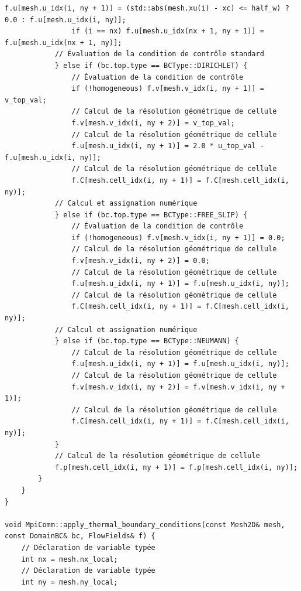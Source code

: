 \documentclass[10pt,a4paper,oneside]{book}
\begin{document}
\begin{lstlisting}[language={[11]C++}]
                f.u[mesh.u_idx(i, ny + 1)] = (std::abs(mesh.xu(i) - xc) <= half_w) ? 0.0 : f.u[mesh.u_idx(i, ny)];
                if (i == nx) f.u[mesh.u_idx(nx + 1, ny + 1)] = f.u[mesh.u_idx(nx + 1, ny)];
            // Évaluation de la condition de contrôle standard
            } else if (bc.top.type == BCType::DIRICHLET) {
                // Évaluation de la condition de contrôle
                if (!homogeneous) f.v[mesh.v_idx(i, ny + 1)] = v_top_val;
                // Calcul de la résolution géométrique de cellule
                f.v[mesh.v_idx(i, ny + 2)] = v_top_val;
                // Calcul de la résolution géométrique de cellule
                f.u[mesh.u_idx(i, ny + 1)] = 2.0 * u_top_val - f.u[mesh.u_idx(i, ny)];
                // Calcul de la résolution géométrique de cellule
                f.C[mesh.cell_idx(i, ny + 1)] = f.C[mesh.cell_idx(i, ny)];
            // Calcul et assignation numérique
            } else if (bc.top.type == BCType::FREE_SLIP) {
                // Évaluation de la condition de contrôle
                if (!homogeneous) f.v[mesh.v_idx(i, ny + 1)] = 0.0;
                // Calcul de la résolution géométrique de cellule
                f.v[mesh.v_idx(i, ny + 2)] = 0.0;
                // Calcul de la résolution géométrique de cellule
                f.u[mesh.u_idx(i, ny + 1)] = f.u[mesh.u_idx(i, ny)];
                // Calcul de la résolution géométrique de cellule
                f.C[mesh.cell_idx(i, ny + 1)] = f.C[mesh.cell_idx(i, ny)];
            // Calcul et assignation numérique
            } else if (bc.top.type == BCType::NEUMANN) {
                // Calcul de la résolution géométrique de cellule
                f.u[mesh.u_idx(i, ny + 1)] = f.u[mesh.u_idx(i, ny)];
                // Calcul de la résolution géométrique de cellule
                f.v[mesh.v_idx(i, ny + 2)] = f.v[mesh.v_idx(i, ny + 1)];
                // Calcul de la résolution géométrique de cellule
                f.C[mesh.cell_idx(i, ny + 1)] = f.C[mesh.cell_idx(i, ny)];
            }
            // Calcul de la résolution géométrique de cellule
            f.p[mesh.cell_idx(i, ny + 1)] = f.p[mesh.cell_idx(i, ny)];
        }
    }
}

void MpiComm::apply_thermal_boundary_conditions(const Mesh2D& mesh, const DomainBC& bc, FlowFields& f) {
    // Déclaration de variable typée
    int nx = mesh.nx_local;
    // Déclaration de variable typée
    int ny = mesh.ny_local;


\end{lstlisting}
\end{document}
